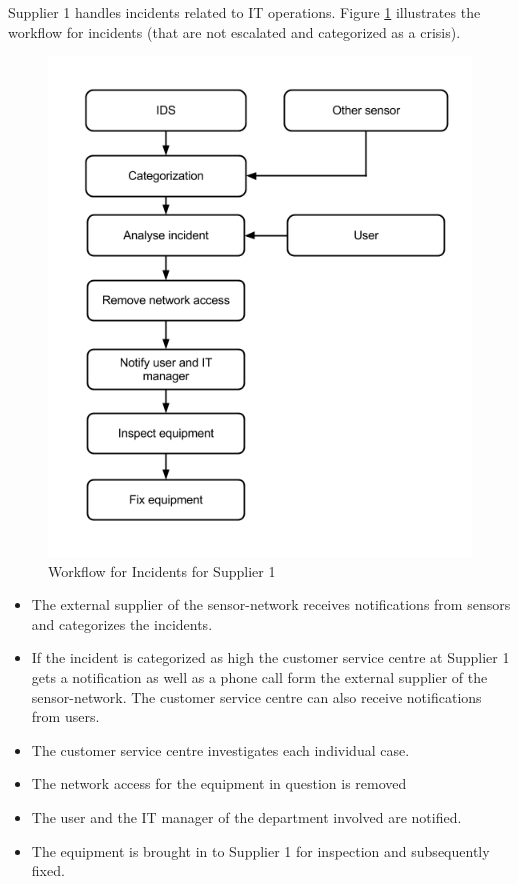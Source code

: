 \documentclass[b5paper, twoside, openright, 11pt]{report}
\begin{document}
Supplier 1 handles incidents related to IT operations. Figure \ref{fig:WorkflowCaseBSupplier1} illustrates the workflow for incidents (that are not escalated and categorized as a crisis).

\begin{figure}[H]
\begin{center}
\includegraphics[scale=0.54]{WorkflowCaseBSupplier1.png}
\caption[Workflow for Incidents, Case B Supplier 1]{Workflow for Incidents for Supplier 1}
\label{fig:WorkflowCaseBSupplier1}
\end{center}
\end{figure}

\begin{itemize}
\item The external supplier of the sensor-network receives notifications from sensors and categorizes the incidents.
\item If the incident is categorized as high the customer service centre at Supplier 1 gets a notification as well as a phone call form the external supplier of the sensor-network. The customer service centre can also receive notifications from users.
\item The customer service centre investigates each individual case.
\item The network access for the equipment in question is removed 
\item The user and the IT manager of the department involved are notified.
\item The equipment is brought in to Supplier 1 for inspection and subsequently fixed.
\end{itemize}
\end{document}
